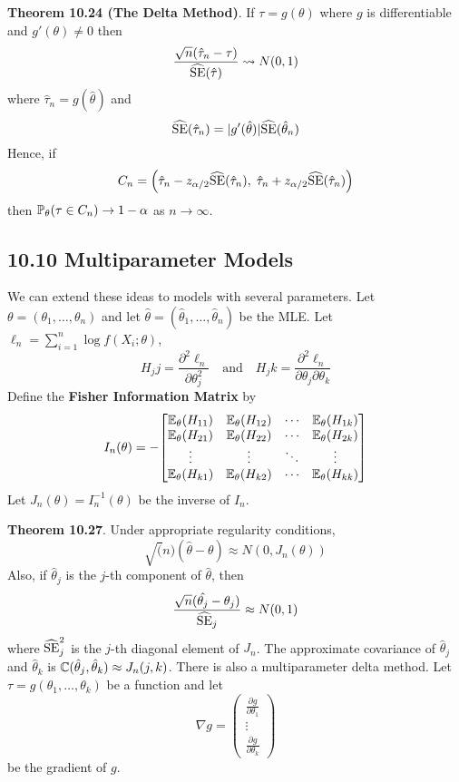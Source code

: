 \textbf{Theorem 10.24 (The Delta Method)}. If \(\tau = g(\theta)\) where
\(g\) is differentiable and \(g'(\theta) \neq 0\) then
\[
\frac{\sqrt{n}(\hat{\tau}_{n} - \tau)}{\widehat{\operatorname{\mathrm{SE}}}(\hat{\tau})} \leadsto N(0, 1)
\]
where \(\hat{\tau}_{n} = g(\hat{\theta})\) and
\[
\widehat{\operatorname{\mathrm{SE}}}(\hat{\tau}_{n}) = |g'(\hat{\theta})| \widehat{\operatorname{\mathrm{SE}}} (\hat{\theta}_{n})
\]
Hence, if
\[
C_{n} = \left( \hat{\tau}_{n} - z_{\alpha/2} \widehat{\SE}(\hat{\tau}_{n}), \; \hat{\tau}_{n} + z_{\alpha/2} \widehat{\SE}(\hat{\tau}_{n}) \right)
\]
then \(\operatorname{\mathbb{P}}_\theta(\tau \in C_{n}) \rightarrow 1 - \alpha\) as
\(n \rightarrow \infty\).

\subsection*{10.10 Multiparameter Models}\label{multiparameter-models}
We can extend these ideas to models with several parameters.
Let \(\theta = (\theta_{1}, \dots, \theta_{n})\) and let
\(\hat{\theta} = (\hat{\theta}_{1}, \dots, \hat{\theta}_{n})\) be the MLE.
Let \(\ell_{n} = \sum_{i=1}^{n} \log f(X_{i}; \theta)\),
\[
H_{j}j = \frac{\partial^{2} \ell_{n}}{\partial \theta_{j}^{2}}
\quad \text{and} \quad
H_{j}k = \frac{\partial^{2} \ell_{n}}{\partial \theta_{j} \partial \theta_{k}}
\]
Define the \textbf{Fisher Information Matrix} by
\[
I_{n}(\theta) = -
\begin{bmatrix}
\EXP_{\theta}(H_{11}) & \EXP_{\theta}(H_{12}) & \cdots & \EXP_{\theta}(H_{1k}) \\
\EXP_{\theta}(H_{21}) & \EXP_{\theta}(H_{22}) & \cdots & \EXP_{\theta}(H_{2k}) \\
\vdots & \vdots & \ddots & \vdots \\
\EXP_{\theta}(H_{k1}) & \EXP_{\theta}(H_{k2}) & \cdots & \EXP_{\theta}(H_{kk})
\end{bmatrix}
\]
Let \(J_{n}(\theta) = I_{n}^{-1}(\theta)\) be the inverse of \(I_{n}\).

\textbf{Theorem 10.27}. Under appropriate regularity conditions,
\[
\sqrt(n)(\hat{\theta} - \theta) \approx N(0, J_{n}(\theta))
\]
Also, if \(\hat{\theta}_{j}\) is the \(j\)-th component of
\(\hat{\theta}\), then
\[
\frac{\sqrt{n}(\hat{\theta_{j}} - \theta_{j})}{\widehat{\operatorname{\mathrm{SE}}}_{j}} \approx N(0, 1)
\]
where \(\widehat{\operatorname{\mathrm{SE}}}_{j}^{2}\) is the \(j\)-th diagonal element of
\(J_{n}\). The approximate covariance of \(\hat{\theta}_{j}\) and
\(\hat{\theta}_{k}\) is
\(\operatorname{\mathbb{C}}(\hat{\theta}_{j}, \hat{\theta}_{k}) \approx J_{n}(j, k)\).
There is also a multiparameter delta method. Let
\(\tau = g(\theta_{1}, \dots, \theta_{k})\) be a function and let
\[
\nabla g = \begin{pmatrix}
\frac{\partial g}{\partial \theta_{1}} \\
\vdots \\
\frac{\partial g}{\partial \theta_{k}}
\end{pmatrix}
\]
be the gradient of \(g\).

